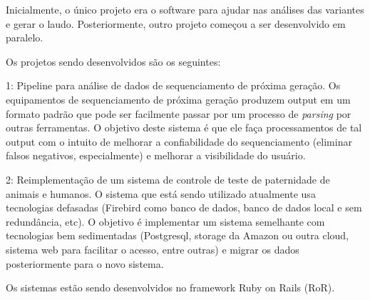 ﻿Inicialmente, o único projeto era o software para ajudar nas análises das variantes e gerar o laudo. Posteriormente, outro projeto começou a ser desenvolvido
em paralelo.

Os projetos sendo desenvolvidos são os seguintes:

1: Pipeline para análise de dados de sequenciamento de próxima geração. Os equipamentos de sequenciamento de próxima geração produzem output em 
um formato padrão que pode ser facilmente passar por um processo de \textit{parsing} por outras ferramentas. O objetivo deste sistema é que ele 
faça processamentos de tal output com o intuito de melhorar a confiabilidade do sequenciamento (eliminar falsos negativos, especialmente) 
e melhorar a visibilidade do usuário.

2: Reimplementação de um sistema de controle de teste de paternidade de animais e humanos. O sistema que está sendo utilizado atualmente usa 
tecnologias defasadas (Firebird como banco de dados, banco de dados local e sem redundância, etc). O objetivo é implementar um sistema semelhante 
com tecnologias bem sedimentadas (Postgresql, storage da Amazon ou outra cloud, sistema web para facilitar o acesso, entre outras) e migrar 
os dados posteriormente para o novo sistema.

Os sistemas estão sendo desenvolvidos no framework Ruby on Rails (RoR). 


